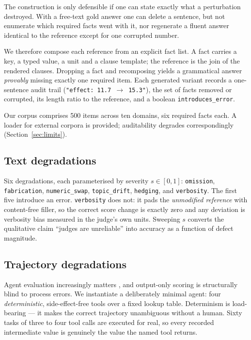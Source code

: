 \documentclass[10pt,letterpaper]{article}
\begin{document}
The construction is only defensible if one can state exactly what a perturbation destroyed. With
a free-text gold answer one can delete a sentence, but not enumerate which required facts went
with it, nor regenerate a fluent answer identical to the reference except for one corrupted
number.

We therefore compose each reference from an explicit fact list. A fact carries a key, a typed
value, a unit and a clause template; the reference is the join of the rendered clauses. Dropping
a fact and recomposing yields a grammatical answer \emph{provably} missing exactly one required
item. Each generated variant records a one-sentence audit trail
(\texttt{"effect: 11.7 $\rightarrow$ 15.3"}), the set of facts removed or corrupted, its length
ratio to the reference, and a boolean \texttt{introduces\_error}.

Our corpus comprises 500 items across ten domains, six required facts each. A loader for external
corpora is provided; auditability degrades correspondingly (Section~\ref{sec:limits}).

\subsection{Text degradations}

Six degradations, each parameterised by severity $s \in [0,1]$: \texttt{omission},
\texttt{fabrication}, \texttt{numeric\_swap}, \texttt{topic\_drift}, \texttt{hedging}, and
\texttt{verbosity}. The first five introduce an error. \texttt{verbosity} does not: it pads the
\emph{unmodified reference} with content-free filler, so the correct score change is exactly zero
and any deviation is verbosity bias measured in the judge's own units. Sweeping $s$ converts the
qualitative claim ``judges are unreliable'' into accuracy as a function of defect magnitude.

\subsection{Trajectory degradations}
\label{sec:traj}

Agent evaluation increasingly matters \cite{yao2023react,yehudai2025survey}, and output-only
scoring is structurally blind to process errors. We instantiate a deliberately minimal agent:
four \emph{deterministic}, side-effect-free tools over a fixed lookup table. Determinism is
load-bearing --- it makes the correct trajectory unambiguous without a human. Sixty tasks of
three to four tool calls are executed for real, so every recorded intermediate value is genuinely
the value the named tool returns.
\end{document}
